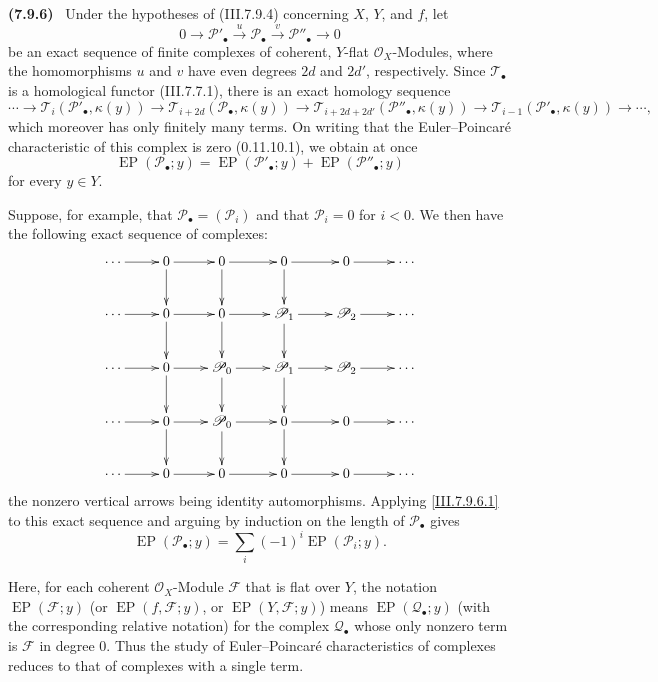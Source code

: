 \documentclass[10pt,oneside]{book}
\newcommand{\sh}[1]{\mathscr{#1}}
\newcommand{\kres}{\kappa}
\newcommand{\sref}[2][]{(#2)}
\newcommand{\oldpage}[2][]{\setcounter{footnote}{0}\marginpar{\scriptsize\textbf{#1}~|~#2}\ignorespaces}
\newenvironment{env}[1][]{\par\medskip\noindent\textbf{(#1)}\ }{\par}
\begin{document}
\begin{env}[7.9.6]
\label{III.7.9.6}
Under the hypotheses of \sref{III.7.9.4} concerning
$X$, $Y$, and $f$, let
\[
  0\longrightarrow\sh{P}'_\bullet
    \xrightarrow{u}\sh{P}_\bullet
    \xrightarrow{v}\sh{P}''_\bullet
    \longrightarrow 0
\]
be an exact sequence of finite complexes of coherent,
$Y$-flat $\sh{O}_X$-Modules, where the homomorphisms $u$
and $v$ have even degrees $2d$ and $2d'$, respectively.
Since $\sh{T}_\bullet$ is a homological functor
\sref{III.7.7.1}, there is an exact homology sequence
\[
  \cdots\longrightarrow
  \sh{T}_i(\sh{P}'_\bullet,\kres(y))
  \longrightarrow
  \sh{T}_{i+2d}(\sh{P}_\bullet,\kres(y))
  \longrightarrow
  \sh{T}_{i+2d+2d'}(\sh{P}''_\bullet,\kres(y))
  \longrightarrow
  \sh{T}_{i-1}(\sh{P}'_\bullet,\kres(y))
  \longrightarrow\cdots ,
\]
which moreover has only finitely many terms.  On writing
that the Euler--Poincar\'e characteristic of this complex is
zero \sref[0]{0.11.10.1}, we obtain at once
\[
  \operatorname{EP}(\sh{P}_\bullet;y)
  =
  \operatorname{EP}(\sh{P}'_\bullet;y)
  +
  \operatorname{EP}(\sh{P}''_\bullet;y)
  \tag{7.9.6.1}\label{III.7.9.6.1}
\]
for every $y\in Y$.

Suppose, for example, that
$\sh{P}_\bullet=(\sh{P}_i)$ and that $\sh{P}_i=0$ for
$i<0$.  We then have the following exact sequence of
complexes:
\[
\xymatrix@C=2.4em{
  \cdots \ar[r] & 0 \ar[r]\ar[d] & 0 \ar[r]\ar[d]
    & 0 \ar[r]\ar[d] & 0 \ar[r] & \cdots \\
  \cdots \ar[r] & 0 \ar[r]\ar[d] & 0 \ar[r]\ar[d]
    & \sh{P}_1 \ar[r]\ar[d] & \sh{P}_2 \ar[r] & \cdots \\
  \cdots \ar[r] & 0 \ar[r]\ar[d] & \sh{P}_0 \ar[r]\ar[d]
    & \sh{P}_1 \ar[r]\ar[d] & \sh{P}_2 \ar[r] & \cdots \\
  \cdots \ar[r] & 0 \ar[r]\ar[d] & \sh{P}_0 \ar[r]\ar[d]
    & 0 \ar[r]\ar[d] & 0 \ar[r] & \cdots \\
  \cdots \ar[r] & 0 \ar[r] & 0 \ar[r]
    & 0 \ar[r] & 0 \ar[r] & \cdots
}
\]
the nonzero vertical arrows being identity automorphisms.
Applying \eqref{III.7.9.6.1} to this exact sequence and
arguing by induction on the length of $\sh{P}_\bullet$
gives
\[
  \operatorname{EP}(\sh{P}_\bullet;y)
  =
  \sum_i(-1)^i\operatorname{EP}(\sh{P}_i;y).
  \tag{7.9.6.2}\label{III.7.9.6.2}
\]

\oldpage[III]{210}
Here, for each coherent $\sh{O}_X$-Module $\sh{F}$ that is
flat over $Y$, the notation
$\operatorname{EP}(\sh{F};y)$ (or
$\operatorname{EP}(f,\sh{F};y)$, or
$\operatorname{EP}(Y,\sh{F};y)$) means
$\operatorname{EP}(\sh{Q}_\bullet;y)$ (with the
corresponding relative notation) for the complex
$\sh{Q}_\bullet$ whose only nonzero term is $\sh{F}$ in
degree $0$.  Thus the study of Euler--Poincar\'e
characteristics of complexes reduces to that of complexes
with a single term.
\end{env}
\end{document}
